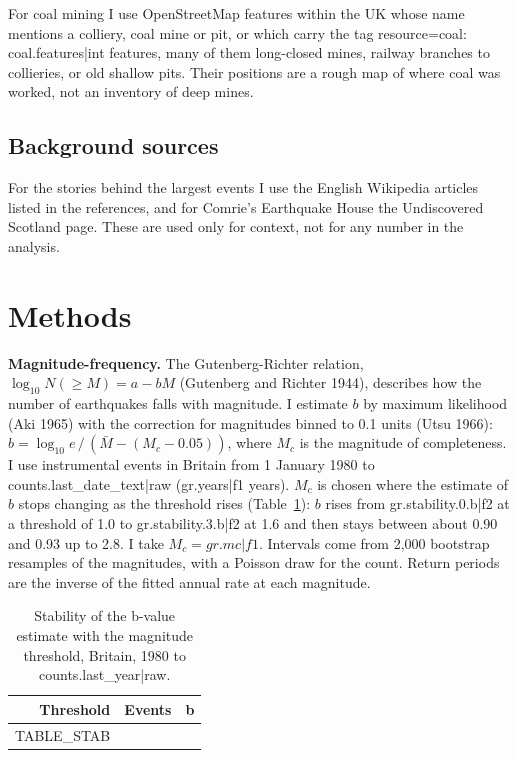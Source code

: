 \documentclass[11pt,a4paper]{article}
\begin{document}
For coal mining I use OpenStreetMap features within the UK whose name mentions a colliery, coal mine or pit, or which carry the tag resource=coal: {{coal.features|int}} features, many of them long-closed mines, railway branches to collieries, or old shallow pits. Their positions are a rough map of where coal was worked, not an inventory of deep mines.

\subsection{Background sources}

For the stories behind the largest events I use the English Wikipedia articles listed in the references, and for Comrie's Earthquake House the Undiscovered Scotland page. These are used only for context, not for any number in the analysis.

\section{Methods}

\textbf{Magnitude-frequency.} The Gutenberg-Richter relation, $\log_{10} N(\geq M) = a - bM$ (Gutenberg and Richter 1944), describes how the number of earthquakes falls with magnitude. I estimate $b$ by maximum likelihood (Aki 1965) with the correction for magnitudes binned to 0.1 units (Utsu 1966): $b = \log_{10} e \,/\, (\bar{M} - (M_c - 0.05))$, where $M_c$ is the magnitude of completeness. I use instrumental events in Britain from 1 January 1980 to {{counts.last_date_text|raw}} ({{gr.years|f1}} years). $M_c$ is chosen where the estimate of $b$ stops changing as the threshold rises (Table~\ref{tab:stab}): $b$ rises from {{gr.stability.0.b|f2}} at a threshold of 1.0 to {{gr.stability.3.b|f2}} at 1.6 and then stays between about 0.90 and 0.93 up to 2.8. I take $M_c = {{gr.mc|f1}}$. Intervals come from 2,000 bootstrap resamples of the magnitudes, with a Poisson draw for the count. Return periods are the inverse of the fitted annual rate at each magnitude.

\begin{table}[tbp]\centering\small
\caption{Stability of the b-value estimate with the magnitude threshold, Britain, 1980 to {{counts.last_year|raw}}.}\label{tab:stab}
\begin{tabular}{rrr}\toprule Threshold & Events & b\\\midrule
{{TABLE_STAB}}
\bottomrule\end{tabular}\end{table}
\end{document}
